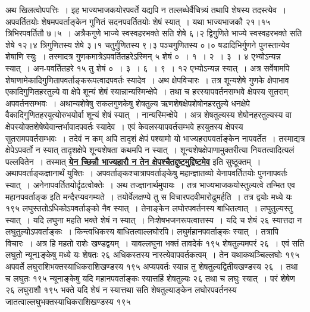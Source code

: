 \documentclass[11pt, openany]{book}
\begin{document}
{{\vspace{-4mm}
 अथ खिलत्वोपपत्तिः~। इह भाज्यभाजकयोरपवर्ते यद्यपि न
तल्लब्धेर्वैचित्र्यं  तथापि शेषस्य तदस्त्येव~। अपवर्तितयोः शेषमपवर्ताङ्केन गुणितं
सदनपवर्तितयोः शेषं  स्यात्~। यथा भाज्यभाजकौ २१।१५ त्रिभिरपवर्तितौ ७।५~। 
अत्रैकगुणे भाज्ये स्वस्वहरभक्ते सति शेषे ६।२ द्विगुणिते भाज्ये स्वस्वहरभक्ते सति शेषे १२।४ त्रिगुणितस्य
शेषे ३।१ चतुर्गुणितस्य ९।३ पञ्चगुणितस्य ०।० षडादिभिर्गुणने पुनस्तान्येव
शेषाणि स्युः~। तस्मादत्र गुणकमात्रेऽपवर्तितहरेऽस्मिन् ५ शेषं ०~। १~। २~।
३~। ४ एभ्योऽन्यन्न स्यात्~। अन-पवर्तितहरे १५ तु शेषं ०~। ३~। ६~। ९~। १२ एभ्योऽन्यन्न स्यात्~। अत्र सर्वेषामपि शेषाणामेकादिगुणितापवर्ताङ्करूपत्वादपवर्तः
स्यादेव~। अथ क्षेपविचारः~। तत्र शून्यशेषे गुणके क्षेपाभाव एकादिगुणितहरतुल्ये वा
क्षेपे शून्यं शेषं स्यान्नान्यस्मिन्क्षेपे~। तथा च हरस्यापवर्तनसम्भवे
क्षेपस्य सुतराम् अपवर्तनसम्भवः~। अथान्यशेषेषु सकलगुणकेषु शेषतुल्य
ऋणशेषक्षेपशेषोनहरतुल्ये धनक्षेपे वैकादिगुणितहरयुत्योरुभयोर्वा शून्यं
शेषं स्यात्~। नान्यस्मिन्क्षेपे~। अत्र शेषतुल्यस्य शेषोनहरतुल्यस्य वा
क्षेपस्योक्तशेषेष्वेवान्तर्भावादपवर्तः स्यादेव~। एवं केवलस्यापवर्तसम्भवे
हरयुतस्य क्षेपस्य सुतरामपवर्तसम्भवः~। तदेवं न कम् अपि तादृशं क्षेपं पश्यामो
यो भाज्यहरापवर्ताङ्केन 
नापवर्तेत~। तस्माद्यत्र क्षेपेऽपवर्तो न स्यात् तादृशक्षेपे शून्यशेषता
कथमपि न स्यात्~। शून्यशेषक्षेपाणामुक्तरीत्या नियतत्वादित्यलं पल्लवितेन~।
तस्मात् \hyperref[50]{\textbf{येन च्छिन्नौ भाज्यहारौ न तेन क्षेपश्चैतद्दुष्टमुद्दिष्टमेव}} इति सुष्ठूक्तम्~।
अथापवर्ताङ्कज्ञानार्थं 
युक्तिः~। अपवर्ताङ्कश्चात्रापवर्ताङ्केषु महान्ज्ञातव्यो येनापवर्तितयोः
पुननापवर्तः स्यात्~।
अनेनापवर्तितयोर्दृढत्वोक्तेः~। अथ तज्ज्ञानार्थमुपायः~।
तत्र भाज्यभाजकयोस्तुल्यत्वे 
तन्मित एव महानपवर्ताङ्क इति मन्दैरप्यवगम्यते~। तयोर्वेलक्षण्ये तु स
विचारपदवीमारोढुमर्हति~। तत्र द्वयोः मध्ये यः १९५ लघुस्ततोऽधिकोऽपवर्ताङ्को
नैव स्यात्~। तेनाङ्केन लघोरपवर्तनस्य बाधितत्वात्~। लघुतुल्यस्तु स्यात्~।
यदि
\newpage
\noindent लघुना महति भक्ते शेषं न स्यात्~। निःशेषभजनरूपत्वात्तस्य~। यदि च शेषं २६ स्यात्तदा न लघुतुल्योऽपवर्ताङ्कः~। किन्त्वधिकस्य
बाधितत्वाल्लघोरपि। 
लघुर्महानपवर्ताङ्कः स्यात्~। तत्रापि विचारः~। अत्र हि महतो राशेः 
खण्डद्वयम्~। यावल्लघुना भक्तं तावदेकं १९५ शेषतुल्यमपरं २६~। एवं सति 
लघुतो न्यूनIङ्केषु मध्ये यः शेषतः २६ अधिकस्तस्य नास्त्येवापवर्तकत्वम्~। 
तेन यथाकथञ्चिल्लघोः १९५ अपवर्ते लघुराशिभक्तस्याधिकराशिखण्डस्य १९५ 
अप्यपवर्तः स्यान्न तु शेषतुल्यद्वितीयखण्डस्य २६~। तथा च लघुतः १९५
 न्यूनाङ्केषु यदि महानपवर्ताङ्कः स्यात्तर्हि शेषतुल्यः २६ तथा च लघुः
स्यात्~। परं शेषेण २६ लघुराशौ १९५ भक्ते यदि शेषं न स्यात्तथा 
सति शेषतुल्याङ्केन लघोरपवर्तनस्य जातत्वाल्लघुभक्तस्याधिकराशिखण्डस्य १९५
}}
\end{document}
